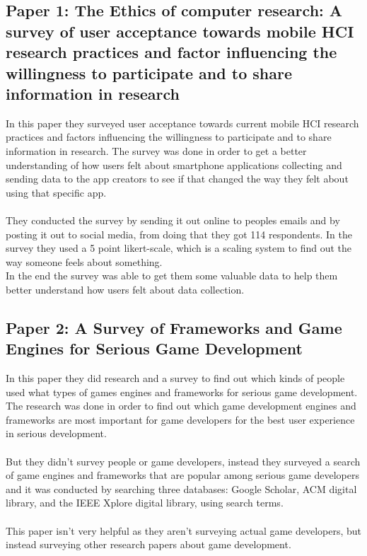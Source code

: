 \documentclass{scrartcl}
\begin{document}
\subsection{Paper 1: The Ethics of computer research: A survey of user acceptance towards mobile HCI research practices and factor influencing the willingness to participate and to share information in research \cite{one}}
In this paper they surveyed user acceptance towards current mobile HCI research practices and factors influencing the willingness to participate and to share information in research.
The survey was done in order to get a better understanding of how users felt about smartphone applications collecting and sending data to the app creators to see if that changed the way they felt about using that specific app.
\\
\\
They conducted the survey by sending it out online to peoples emails and by posting it out to social media, from doing that they got 114 respondents.
In the survey they used a 5 point likert-scale, which is a scaling system to find out the way someone feels about something.
\\
In the end the survey was able to get them some valuable data to help them better understand how users felt about data collection.

\subsection{Paper 2: A Survey of Frameworks and Game Engines for Serious Game Development \cite{two}}
In this paper they did research and a survey to find out which kinds of people used what types of games engines and frameworks for serious game development.
\\
The research was done in order to find out which game development engines and frameworks are most important for game developers for the best user experience in serious development.
\\
\\
But they didn't survey people or game developers, instead they surveyed a search of game engines and frameworks that are popular among serious game developers and it was conducted by searching three databases: Google Scholar, ACM digital library, and the IEEE Xplore digital library, using search terms.
\\
\\
This paper isn't very helpful as they aren't surveying actual game developers, but instead surveying other research papers about game development.
\end{document}
